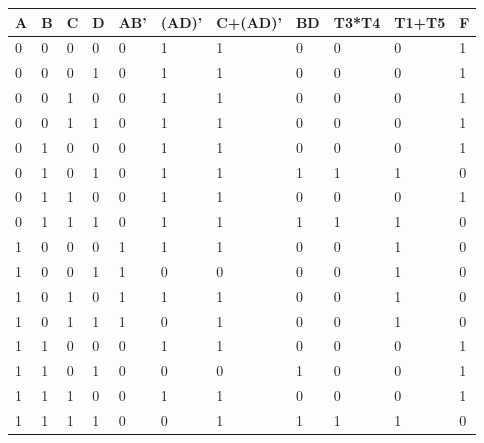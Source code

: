 \begin{enumerate}
\begin{enumerate}
\begin{onlysolution}
                    \begin{tabular}{l|l|l|l|l|l|l|l|l|l|l}
                        A &  B &  C &  D & AB' & (AD)' & C+(AD)' & BD & T3*T4 & T1+T5  &  F  \\ \hline \rowcolor{gray!15}
                        0 &  0 &  0 &  0 &  0 &  1     &  1      &  0 &  0    &  0     &  1  \\ \hline
                        0 &  0 &  0 &  1 &  0 &  1     &  1      &  0 &  0    &  0     &  1  \\ \hline \rowcolor{gray!15}
                        0 &  0 &  1 &  0 &  0 &  1     &  1      &  0 &  0    &  0     &  1  \\ \hline
                        0 &  0 &  1 &  1 &  0 &  1     &  1      &  0 &  0    &  0     &  1  \\ \hline \rowcolor{gray!15}
                        0 &  1 &  0 &  0 &  0 &  1     &  1      &  0 &  0    &  0     &  1  \\ \hline
                        0 &  1 &  0 &  1 &  0 &  1     &  1      &  1 &  1    &  1     &  0  \\ \hline \rowcolor{gray!15}
                        0 &  1 &  1 &  0 &  0 &  1     &  1      &  0 &  0    &  0     &  1  \\ \hline
                        0 &  1 &  1 &  1 &  0 &  1     &  1      &  1 &  1    &  1     &  0  \\ \hline \rowcolor{gray!15}
                        1 &  0 &  0 &  0 &  1 &  1     &  1      &  0 &  0    &  1     &  0  \\ \hline
                        1 &  0 &  0 &  1 &  1 &  0     &  0      &  0 &  0    &  1     &  0  \\ \hline \rowcolor{gray!15}
                        1 &  0 &  1 &  0 &  1 &  1     &  1      &  0 &  0    &  1     &  0  \\ \hline
                        1 &  0 &  1 &  1 &  1 &  0     &  1      &  0 &  0    &  1     &  0  \\ \hline \rowcolor{gray!15}
                        1 &  1 &  0 &  0 &  0 &  1     &  1      &  0 &  0    &  0     &  1  \\ \hline
                        1 &  1 &  0 &  1 &  0 &  0     &  0      &  1 &  0    &  0     &  1  \\ \hline \rowcolor{gray!15}
                        1 &  1 &  1 &  0 &  0 &  1     &  1      &  0 &  0    &  0     &  1  \\ \hline
                        1 &  1 &  1 &  1 &  0 &  0     &  1      &  1 &  1    &  1     &  0  \\
                    \end{tabular}
                \end{onlysolution}


\end{enumerate}
\end{enumerate}
